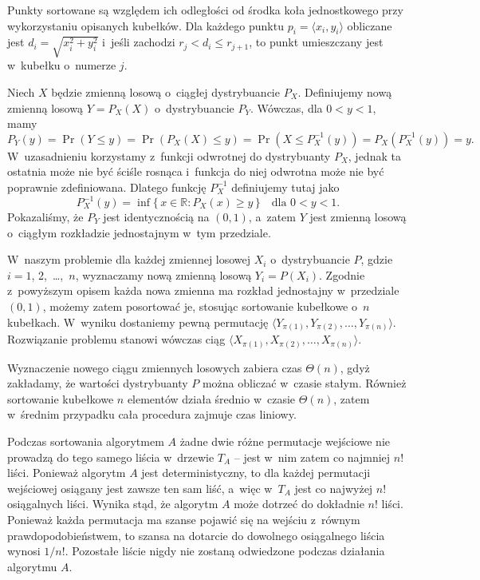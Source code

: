 Punkty sortowane są względem ich odległości od środka koła jednostkowego przy wykorzystaniu opisanych kubełków. Dla każdego punktu $p_i=\langle x_i,y_i\rangle$ obliczane jest $d_i=\sqrt{x_i^2+y_i^2}$ i~jeśli zachodzi $r_j<d_i\le r_{j+1}$, to punkt umieszczany jest w~kubełku o~numerze $j$.

\exercise %
Niech $X$ będzie zmienną losową o~ciągłej dystrybuancie $P_X$. Definiujemy nową zmienną losową $Y=P_X(X)$ o~dystrybuancie $P_Y$. Wówczas, dla $0<y<1$, mamy
\[
    P_Y(y) = \Pr(Y\le y) = \Pr(P_X(X)\le y) = \Pr(X\le P_X^{-1}(y)) = P_X(P_X^{-1}(y)) = y.
\]
W~uzasadnieniu korzystamy z~funkcji odwrotnej do dystrybuanty $P_X$, jednak ta ostatnia może nie być ściśle rosnąca i~funkcja do niej odwrotna może nie być poprawnie zdefiniowana. Dlatego funkcję $P_X^{-1}$ definiujemy tutaj jako
\[
	P_X^{-1}(y) = \inf\{\,x\in\mathbb{R}:P_X(x)\ge y\,\} \quad\text{dla $0<y<1$}.
\]
Pokazaliśmy, że $P_Y$ jest identycznością na $(0,1)$, a~zatem $Y$ jest zmienną losową o~ciągłym rozkładzie jednostajnym w~tym przedziale.

W~naszym problemie dla każdej zmiennej losowej $X_i$ o~dystrybuancie $P$, gdzie $i=1$, 2,~\dots,~$n$, wyznaczamy nową zmienną losową $Y_i=P(X_i)$. Zgodnie z~powyższym opisem każda nowa zmienna ma rozkład jednostajny w~przedziale $(0,1)$, możemy zatem posortować je, stosując sortowanie kubełkowe o~$n$ kubełkach. W~wyniku dostaniemy pewną permutację $\langle Y_{\pi(1)},Y_{\pi(2)},\dots,Y_{\pi(n)}\rangle$. Rozwiązanie problemu stanowi wówczas ciąg $\langle X_{\pi(1)},X_{\pi(2)},\dots,X_{\pi(n)}\rangle$.

Wyznaczenie nowego ciągu zmiennych losowych zabiera czas $\Theta(n)$, gdyż zakładamy, że wartości dystrybuanty $P$ można obliczać w~czasie stałym. Również sortowanie kubełkowe $n$ elementów działa średnio w~czasie $\Theta(n)$, zatem w~średnim przypadku cała procedura zajmuje czas liniowy.

\problems


\subproblem %
Podczas sortowania algorytmem $A$ żadne dwie różne permutacje wejściowe nie prowadzą do tego samego liścia w~drzewie $T_A$ -- jest w~nim zatem co najmniej $n!$ liści. Ponieważ algorytm $A$ jest deterministyczny, to dla każdej permutacji wejściowej osiągany jest zawsze ten sam liść, a~więc w~$T_A$ jest co najwyżej $n!$ osiągalnych liści. Wynika stąd, że algorytm $A$ może dotrzeć do dokładnie $n!$ liści. Ponieważ każda permutacja ma szanse pojawić się na wejściu z~równym prawdopodobieństwem, to szansa na dotarcie do dowolnego osiągalnego liścia wynosi $1/n!$. Pozostałe liście nigdy nie zostaną odwiedzone podczas działania algorytmu $A$.

